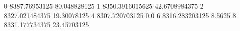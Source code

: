 0 8387.76953125 80.048828125
1 8350.3916015625 42.6708984375
2 8327.021484375 19.30078125
4 8307.720703125 0.0
6 8316.283203125 8.5625
8 8331.177734375 23.45703125
